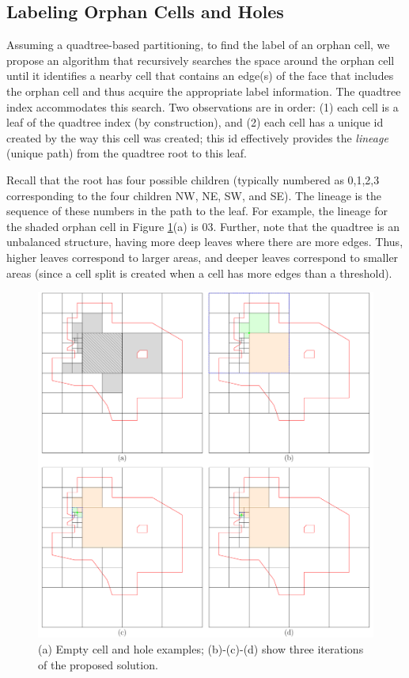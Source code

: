 \subsection{Labeling Orphan Cells and Holes} \label{sec:anomalies}
Assuming a quadtree-based partitioning, to find the label of an orphan cell, we propose an algorithm that recursively searches the space around the orphan cell
until it identifies a nearby cell that contains an edge(s) of the face that includes the orphan cell and thus acquire the appropriate label information. The 
quadtree index accommodates this search. Two observations are in order: (1) each cell is a leaf of the quadtree index (by construction), and (2) each cell has a 
unique id created by the way this cell was created; this id effectively provides the \textit{lineage} (unique path) from the quadtree root to this leaf.

Recall that the root has four possible children (typically numbered as 0,1,2,3 corresponding to the four children NW, NE, SW, and SE). The lineage is the 
sequence of these numbers in the path to the leaf. For example, the lineage for the shaded orphan cell in Figure \ref{fig:orphan_cells}(a) is 03. Further, note 
that the quadtree is an unbalanced structure, having more deep leaves where there are more edges. Thus, higher leaves correspond to larger areas, and deeper 
leaves correspond to smaller areas (since a cell split is created when a cell has more edges than a threshold).

\begin{figure}
    \centering
    \includegraphics[width=\textwidth]{chapterSDCEL/orphan_cells/orphan_cells}    
    \caption{(a) Empty cell and hole examples; (b)-(c)-(d) show three iterations of the proposed solution.} \label{fig:orphan_cells}
\end{figure}

